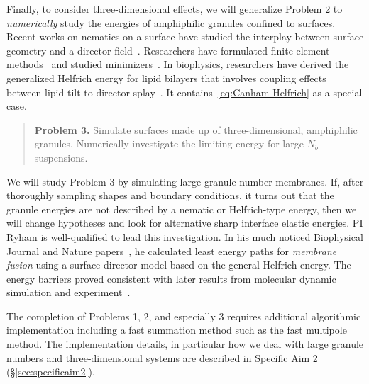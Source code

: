 Finally, to consider three-dimensional effects, we will generalize
Problem 2 to \emph{numerically} study the energies of amphiphilic
granules confined to surfaces. Recent works on nematics on a surface have
studied the interplay between surface geometry and a director
field~\cite{Nestler2020PropertiesOS, Nitschke2018NematicLC,
Nestler2018OrientationalOO, Nitschke2019HydrodynamicII,
Nitschke2020LiquidCO}. Researchers have formulated finite element
methods~\cite{Bartels2012FiniteEM, Nochetto2015NumericsFL,
Nestler2019AFE} and studied minimizers~\cite{Segatti2014EquilibriumCO,
Segatti2014AnalysisOA}. In biophysics, researchers
have derived the generalized Helfrich energy for lipid bilayers that
involves coupling effects between lipid tilt to director
splay~\cite{Hamm2000ElasticEO, Terzi2019CurvatureTiltTO, Terzi2019ACQ,
  Terzi2017NovelTC, Pinigin2020NewCT,Rangamani20140463}. It contains~\eqref{eq:Canham-Helfrich}
as a special case.
\begin{quotation}
  \noindent
  \textbf{Problem 3.} Simulate surfaces made up of three-dimensional,
  amphiphilic granules. Numerically investigate the limiting energy for
  large-$N_b$ suspensions.
\end{quotation}
We will study Problem 3 by simulating large granule-number membranes.
If, after thoroughly sampling shapes and boundary conditions,
it turns out that the granule energies are not described by
a nematic or  Helfrich-type energy, then we will change
hypotheses and look for alternative sharp interface elastic energies.
PI Ryham is well-qualified to lead this investigation.
In his much noticed Biophysical Journal and Nature
papers~\cite{RyKlYaCo16, Chetal16}, he calculated least energy
paths for \emph{membrane fusion} using a surface-director model based on
the general Helfrich energy. The energy barriers 
proved consistent with later results from molecular dynamic
simulation and experiment~\cite{SmRiMu19, 2017PNAS..114.1238F}.

The completion of Problems 1, 2, and especially 3 requires additional
algorithmic implementation including a fast summation method such as the
fast multipole method. The implementation details, in particular how we
deal with large granule numbers and three-dimensional systems are
described in Specific Aim 2 (\S\ref{sec:specificaim2}).




